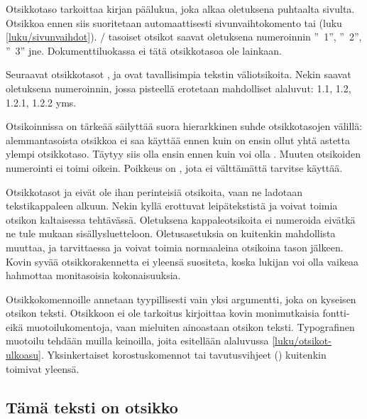 Otsikkotaso  tarkoittaa kirjan päälukua, joka alkaa
oletuksena puhtaalta sivulta. Otsikkoa ennen siis suoritetaan
automaattisesti sivunvaihtokomento  tai
 (luku \ref{luku/sivunvaihdot}).
\-/ tasoiset otsikot saavat oletuksena numeroinnin
''\chaptername~1'', ''\chaptername~2'', ''\chaptername~3'' jne.
Dokumenttiluokassa  ei tätä otsikkotasoa ole lainkaan.

Seuraavat otsikkotasot ,  ja
 ovat tavallisimpia tekstin väliotsikoita. Nekin
saavat oletuksena numeroinnin, jossa pisteellä erotetaan mahdolliset
alaluvut: 1.1, 1.2, 1.2.1, 1.2.2 yms.

Otsikoinnissa on tärkeää säilyttää suora hierarkkinen suhde
otsikkotasojen välillä: alemmantasoista otsikkoa ei saa käyttää ennen
kuin on ensin ollut yhtä astetta ylempi otsikkotaso. Täytyy siis olla
ensin  ennen kuin voi olla . Muuten
otsikoiden numerointi ei toimi oikein. Poikkeus on , jota
ei välttämättä tarvitse käyttää.

Otsikkotasot  ja  eivät ole
ihan perinteisiä otsikoita, vaan ne ladotaan tekstikappaleen alkuun.
Nekin kyllä erottuvat leipätekstistä ja voivat toimia otsikon
kaltaisessa tehtävässä. Oletuksena kappaleotsikoita ei numeroida eivätkä
ne tule mukaan sisällysluetteloon. Oletusasetuksia on kuitenkin
mahdollista muuttaa, ja tarvittaessa  ja
 voivat toimia normaaleina otsikoina tason
 jälkeen. Kovin syvää otsikkorakennetta ei
yleensä suositeta, koska lukijan voi olla vaikeaa hahmottaa monitasoisia
kokonaisuuksia.

Otsikkokomennoille annetaan tyypillisesti vain yksi argumentti, joka on
kyseisen otsikon teksti. Otsikkoon ei ole tarkoitus kirjoittaa kovin
monimutkaisia fontti- eikä muotoilukomentoja, vaan mieluiten ainoastaan
otsikon teksti. Typografinen muotoilu tehdään muilla keinoilla, joita
esitellään alaluvussa \ref{luku/otsikot-ulkoasu}. Yksinkertaiset
korostuskomennot tai tavutusvihjeet (\komento{-}) kuitenkin toimivat
yleensä.

\begin{koodilohkosis}
\section{Tämä teksti on otsikko}
\end{koodilohkosis}

